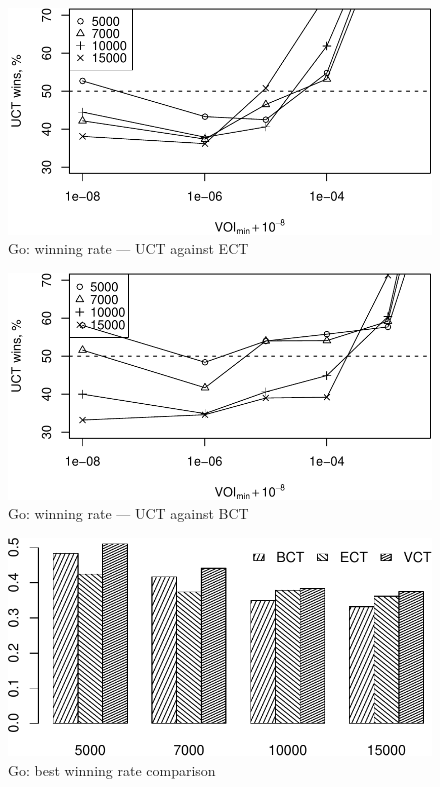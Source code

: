 \documentclass{article}
\begin{document}
\begin{figure}[h]
\centering
\includegraphics[scale=0.8]{ect-wins.pdf}
\caption{Go: winning rate --- UCT against ECT}
\label{fig:uct-against-ect}
\end{figure}

\begin{figure}[h]
\centering
\includegraphics[scale=0.8]{bct-wins.pdf}
\caption{Go: winning rate --- UCT against BCT}
\label{fig:uct-against-bct}
\end{figure}

\begin{figure}[h]
\centering
\includegraphics[scale=0.8]{bests-bw.pdf}
\caption{Go: best winning rate comparison}
\label{fig:best-winning-rate}
\end{figure}
\end{document}
